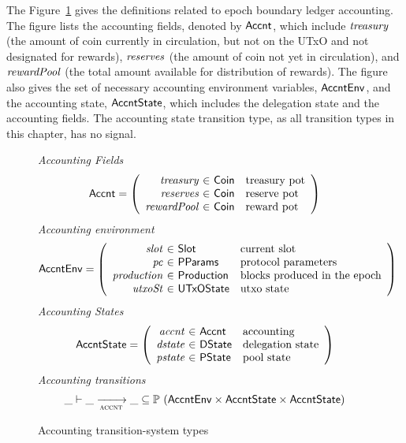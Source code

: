 The Figure~\ref{fig:ts-types:accnt} gives the definitions related to epoch
boundary ledger accounting. The figure lists the accounting fields, denoted by
$\mathsf{Accnt}$, which include $\mathit{treasury}$ (the amount of coin currently in
circulation, but not on the UTxO and not designated for rewards),
$\mathit{reserves}$ (the amount of coin
not yet in circulation),
and $\mathit{rewardPool}$ (the total amount available for distribution of rewards).
The figure also gives the set of necessary accounting environment
variables, $\mathsf{AccntEnv}$, and the accounting state, $\mathsf{AccntState}$, which includes
the delegation state and the accounting fields. The accounting state transition
type, as all transition types in this chapter, has no signal.

\begin{figure}[htb]
  \emph{Accounting Fields}
  \begin{equation*}
    \Accnt =
    \left(
      \begin{array}{r@{~\in~}ll}
        \var{treasury} & \Coin & \text{treasury pot}\\
        \var{reserves} & \Coin & \text{reserve pot}\\
        \var{rewardPool} & \Coin & \text{reward pot}\\
      \end{array}
    \right)
  \end{equation*}
  \emph{Accounting environment}
  \begin{equation*}
    \AccntEnv =
    \left(
      \begin{array}{r@{~\in~}ll}
        \var{slot} & \Slot & \text{current slot}\\
        \var{pc} & \PParams & \text{protocol parameters}\\
        \var{production} & \Production & \text{blocks produced in the epoch}\\
        \var{utxoSt} & \UTxOState & \text{utxo state}\\
      \end{array}
    \right)
  \end{equation*}
  \emph{Accounting States}
  \begin{equation*}
    \AccntState =
    \left(
      \begin{array}{r@{~\in~}ll}
        \var{accnt} & \Accnt & \text{accounting}\\
        \var{dstate} & \DState & \text{delegation state}\\
        \var{pstate} & \PState & \text{pool state}\\
      \end{array}
    \right)
  \end{equation*}
  \emph{Accounting transitions}
  \begin{equation*}
    \_ \vdash
    \var{\_} \trans{accnt}{} \var{\_}
    \subseteq \powerset (\AccntEnv \times \AccntState \times \AccntState)
  \end{equation*}
  \caption{Accounting transition-system types}
  \label{fig:ts-types:accnt}
\end{figure}


